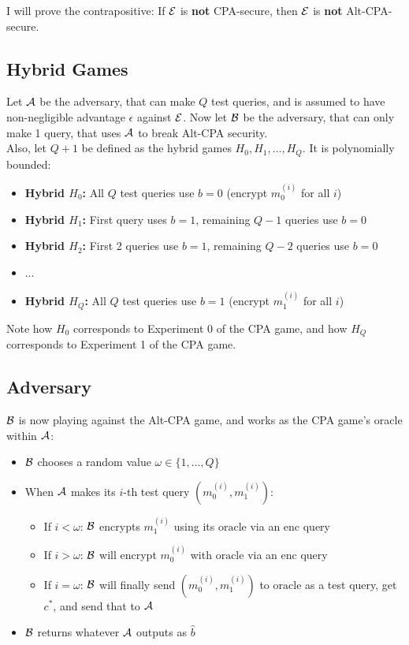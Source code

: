 \documentclass[12pt]{article}
\theoremstyle{plain}
\theoremstyle{definition}
\begin{document}
\begin{solution}
\noindent I will prove the contrapositive: If $\mathcal{E}$ is \textbf{not} CPA-secure, then $\mathcal{E}$ is \textbf{not} Alt-CPA-secure.


\subsection*{Hybrid Games}
Let $\mathcal{A}$ be the adversary, that can make $Q$ test queries, and is assumed to have non-negligible advantage $\epsilon$ against $\mathcal{E}$. 
Now let $\mathcal{B}$ be the adversary, that can only make 1 query, that uses $\mathcal{A}$ to break Alt-CPA security.\\

\noindent Also, let $Q+1$ be defined as the hybrid games $H_0, H_1, \ldots, H_Q$. It is polynomially bounded:
\begin{itemize}
    \item \textbf{Hybrid $H_0$:} All $Q$ test queries use $b=0$ (encrypt $m_0^{(i)}$ for all $i$)
    \item \textbf{Hybrid $H_1$:} First query uses $b=1$, remaining $Q-1$ queries use $b=0$
    \item \textbf{Hybrid $H_2$:} First 2 queries use $b=1$, remaining $Q-2$ queries use $b=0$
    \item $\ldots$
    \item \textbf{Hybrid $H_Q$:} All $Q$ test queries use $b=1$ (encrypt $m_1^{(i)}$ for all $i$)
\end{itemize}

Note how $H_0$ corresponds to Experiment 0 of the CPA game, and how $H_Q$ corresponds to Experiment 1 of the CPA game.

\subsection*{Adversary}
$\mathcal{B}$ is now playing against the Alt-CPA game, and works as the CPA game's oracle within $\mathcal{A}$:
\begin{itemize}
    \item $\mathcal{B}$ chooses a random value $\omega \in \{1, \ldots, Q\}$
    \item When $\mathcal{A}$ makes its $i$-th test query $(m_0^{(i)}, m_1^{(i)})$:
    \begin{itemize}
        \item If $i < \omega$: $\mathcal{B}$ encrypts $m_1^{(i)}$ using its $\text{oracle}$ via an enc query
        \item If $i > \omega$: $\mathcal{B}$ will encrypt $m_0^{(i)}$ with $\text{oracle}$ via an enc query
        \item If $i = \omega$: $\mathcal{B}$ will finally send $(m_0^{(i)}, m_1^{(i)})$ to $\text{oracle}$ as a test query, get $c^*$, and send that to $\mathcal{A}$
    \end{itemize}
    \item $\mathcal{B}$ returns whatever $\mathcal{A}$ outputs as $\hat{b}$
\end{itemize}


\end{solution}
\end{document}
